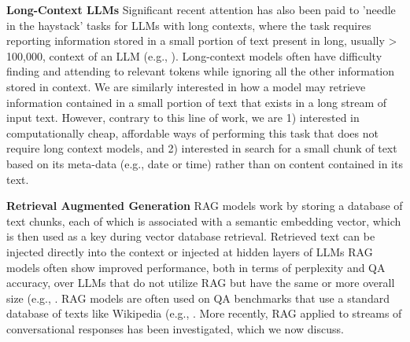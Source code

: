 \documentclass{article}
\begin{document}
\textbf{Long-Context LLMs} Significant recent attention has also been paid to 'needle in the haystack' tasks for LLMs with long contexts, where the task requires reporting information stored in a small portion of text present in long, usually > 100,000, context of an LLM (e.g., \cite{ding2023longnet, chen2023extending, bertsch2024unlimiformer, bulatov2023scaling, ma2024megalodon}). Long-context models often have difficulty finding and attending to relevant tokens while ignoring all the other information stored in context. We are similarly interested in how a model may retrieve information contained in a small portion of text that exists in a long stream of input text. However, contrary to this line of work, we are 1) interested in computationally cheap, affordable ways of performing this task that does not require long context models, and 2) interested in search for a small chunk of text based on its meta-data (e.g., date or time) rather than on content contained in its text.

\textbf{Retrieval Augmented Generation} RAG models \cite{lewis2020retrieval} work by storing a database of text chunks, each of which is associated with a semantic embedding vector, which is then used as a key during vector database retrieval. Retrieved text can be injected directly into the context or injected at hidden layers of LLMs \cite{borgeaud2022improving} RAG models often show improved performance, both in terms of perplexity and QA accuracy, over LLMs that do not utilize RAG but have the same or more overall size (e.g., \cite{lewis2020retrieval, borgeaud2022improving}. RAG models are often used on QA benchmarks that use a standard database of texts like Wikipedia (e.g., \cite{kwiatkowski2019natural, yang2018hotpotqa}. More recently, RAG applied to streams of conversational responses has been investigated, which we now discuss.
\end{document}
